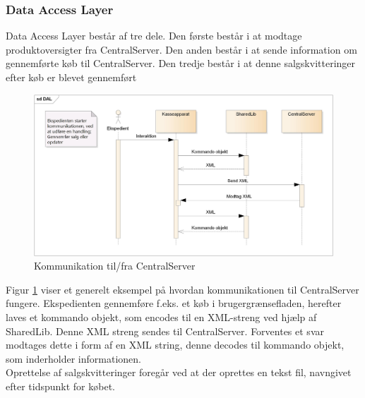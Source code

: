 \subsubsection{Data Access Layer}
Data Access Layer består af tre dele. Den første består i at modtage produktoversigter fra CentralServer. Den anden består i at sende information om gennemførte køb til CentralServer. Den tredje består i at denne salgskvitteringer efter køb er blevet gennemført

\begin{figure}[H]
	\centering
	\includegraphics[width=\textwidth]{Projektbeskrivelse/DesignOgImplementering/Frontend/Pics/DALsq}
	\caption{Kommunikation til/fra CentralServer}
	\label{fig:KAtCS}
\end{figure}

Figur \ref{fig:KAtCS} viser et generelt eksempel på hvordan kommunikationen til CentralServer fungere. Ekspedienten gennemføre f.eks. et køb i brugergrænsefladen, herefter laves et kommando objekt, som encodes til en XML-streng ved hjælp af SharedLib. Denne XML streng sendes til CentralServer. Forventes et svar modtages dette i form af en XML string, denne decodes til kommando objekt, som inderholder informationen.\\
Oprettelse af salgskvitteringer foregår ved at der oprettes en tekst fil, navngivet efter tidspunkt for købet.


